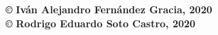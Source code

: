 {
\thispagestyle{empty}
\vspace*{18.5cm}

\begin{flushleft}
\textbf{\copyright} \hspace{0.08cm} \textbf{Iván Alejandro Fernández Gracia, 2020}\\
\textbf{\copyright} \hspace{0.08cm} \textbf{Rodrigo Eduardo Soto Castro, 2020}
\end{flushleft}
\vspace{0.5cm}


}

